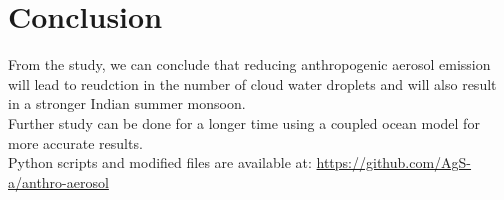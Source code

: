 \documentclass{article}
\begin{document}
\section{Conclusion}

\indent From the study, we can conclude that reducing anthropogenic aerosol emission will lead to reudction in the number of cloud water droplets and will also result in a stronger Indian summer monsoon.\\
\indent Further study can be done for a longer time using a coupled ocean model for more accurate results.\\

\indent Python scripts and modified files are available at: \url{https://github.com/AgS-a/anthro-aerosol}\\ 

\end{document}

